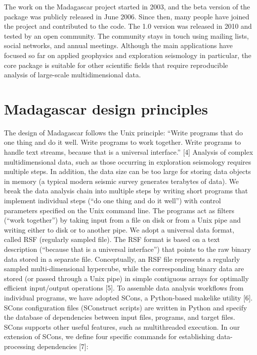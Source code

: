 The work on the Madagascar project started in 2003, and the beta
version of the package was publicly released in June 2006. Since then,
many people have joined the project and contributed to the code. The
1.0 version was released in 2010 and tested by an open community. The
community stays in touch using mailing lists, social networks, and
annual meetings.  Although the main applications have focused so far
on applied geophysics and exploration seismology in particular, the
core package is suitable for other scientific fields that require
reproducible analysis of large-scale multidimensional data.

\section{Madagascar design principles}

The design of Madagascar follows the Unix principle: ``Write
programs that do one thing and do it well. Write programs to work
together. Write programs to handle text streams, because that is a
universal interface.'' [4] Analysis of complex multidimensional
data, such as those occurring in exploration seismology requires
multiple steps. In addition, the data size can be too large for
storing data objects in memory (a typical modern seismic survey
generates terabytes of data). We break the data analysis chain into
multiple steps by writing short programs that implement individual
steps (``do one thing and do it well'') with control
parameters specified on the Unix command line. The programs act as
filters (``work together'') by taking input from a file
on disk or from a Unix pipe and writing either to disk or to another
pipe. We adopt a universal data format, called RSF (regularly sampled
file). The RSF format is based on a text description (``because
that is a universal interface'') that points to the raw binary
data stored in a separate file. Conceptually, an RSF file represents a
regularly sampled multi-dimensional hypercube, while the corresponding
binary data are stored (or passed through a Unix pipe) in simple
contiguous arrays for optimally efficient input/output operations [5].
To assemble data analysis workflows from individual programs, we have
adopted SCons, a Python-based makelike utility [6]. SCons
configuration files (SConstruct scripts) are written in Python and
specify the database of dependencies between input files, programs,
and target files. SCons supports other useful features, such as
multithreaded execution. In our extension of SCons, we define four
specific commands for establishing data-processing dependencies [7]:

